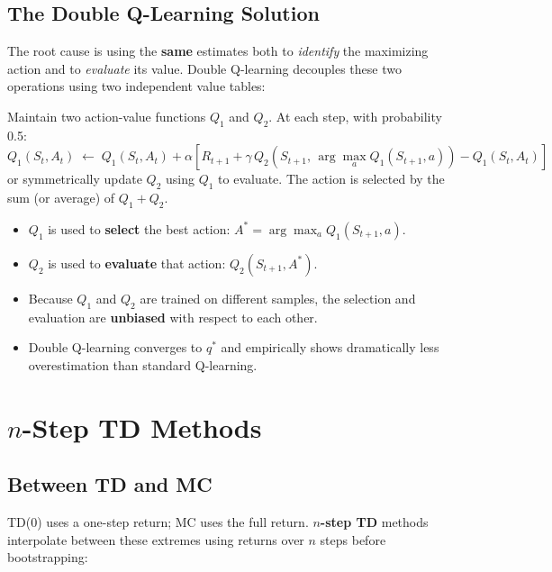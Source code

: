 \documentclass[11pt,a4paper]{article}
\theoremstyle{definition}
\theoremstyle{plain}
\theoremstyle{remark}
\begin{document}
\subsection{The Double Q-Learning Solution}

The root cause is using the \textbf{same} estimates both to \textit{identify} the maximizing action and to \textit{evaluate} its value. Double Q-learning decouples these two operations using two independent value tables:

\begin{tcolorbox}[colback=blue!5!white, colframe=blue!60!black, title={Double Q-Learning Update}]
Maintain two action-value functions $Q_1$ and $Q_2$. At each step, with probability 0.5:
\[
    Q_1(S_t, A_t) \;\leftarrow\; Q_1(S_t, A_t) + \alpha\!\left[R_{t+1} + \gamma\, Q_2\!\left(S_{t+1},\, \arg\max_a Q_1(S_{t+1}, a)\right) - Q_1(S_t, A_t)\right]
\]
or symmetrically update $Q_2$ using $Q_1$ to evaluate. The action is selected by the sum (or average) of $Q_1 + Q_2$.
\end{tcolorbox}

\begin{itemize}
    \item $Q_1$ is used to \textbf{select} the best action: $A^* = \arg\max_a Q_1(S_{t+1}, a)$.
    \item $Q_2$ is used to \textbf{evaluate} that action: $Q_2(S_{t+1}, A^*)$.
    \item Because $Q_1$ and $Q_2$ are trained on different samples, the selection and evaluation are \textbf{unbiased} with respect to each other.
    \item Double Q-learning converges to $q^*$ and empirically shows dramatically less overestimation than standard Q-learning.
\end{itemize}

\section{$n$-Step TD Methods}

\subsection{Between TD and MC}

TD(0) uses a one-step return; MC uses the full return. \textbf{$n$-step TD} methods interpolate between these extremes using returns over $n$ steps before bootstrapping:
\end{document}
